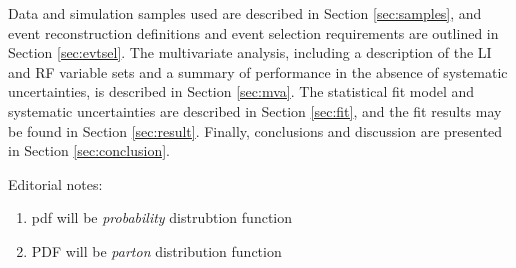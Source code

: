 

Data and simulation samples used are described in Section \ref{sec:samples}, and event reconstruction definitions and event selection requirements are outlined in Section \ref{sec:evtsel}.  The multivariate analysis, including a description of the LI and RF variable sets and a summary of performance  in the absence of systematic uncertainties, is described in Section \ref{sec:mva}.  The statistical fit model and systematic uncertainties are described in Section \ref{sec:fit}, and the fit results may be found in Section \ref{sec:result}.  Finally, conclusions and discussion are presented in Section \ref{sec:conclusion}.


Editorial notes: 
\begin{enumerate}
\item pdf will be \emph{probability} distrubtion function
\item PDF will be \emph{parton} distribution function
\end{enumerate}
